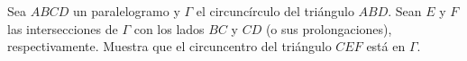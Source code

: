 Sea $ABCD$ un paralelogramo y $\Gamma$ el circuncírculo del triángulo $ABD$. Sean $E$ y $F$ las intersecciones de $\Gamma$ con los lados $BC$ y $CD$ (o sus prolongaciones), respectivamente. Muestra que el circuncentro del triángulo $CEF$ está en $\Gamma$.
